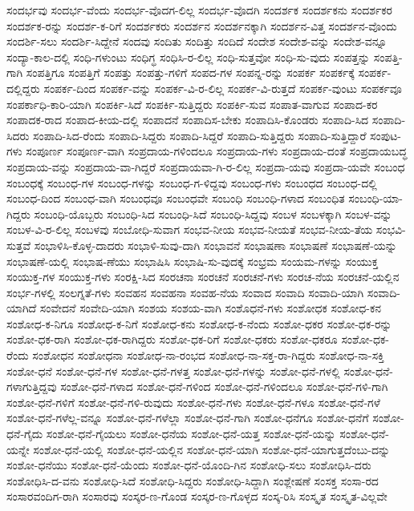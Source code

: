 {ಸಂದರ್ಭವು
ಸಂದರ್ಭ-ವೆಂದು
ಸಂದರ್ಭ-ವೊದಗ-ಲಿಲ್ಲ
ಸಂದರ್ಭ-ವೊದಗಿ
ಸಂದರ್ಶಕ
ಸಂದರ್ಶಕನು
ಸಂದರ್ಶಕರ
ಸಂದರ್ಶಕ-ರನ್ನು
ಸಂದರ್ಶ-ಕ-ರಿಗೆ
ಸಂದರ್ಶಕರು
ಸಂದರ್ಶನ
ಸಂದರ್ಶನಕ್ಕಾಗಿ
ಸಂದರ್ಶನ-ವಿತ್ತ
ಸಂದರ್ಶನ-ವೊಂದು
ಸಂದರ್ಶಿ-ಸಲು
ಸಂದರ್ಶಿ-ಸಿದ್ದೇನೆ
ಸಂದವು
ಸಂದಿತು
ಸಂದಿತ್ತು
ಸಂದಿದೆ
ಸಂದೇಶ
ಸಂದೇಶ-ವನ್ನು
ಸಂದೇಶ-ವನ್ನೂ
ಸಂದ್ಯಾ-ಕಾಲ-ದಲ್ಲಿ
ಸಂಧಿ-ಗಳುಂಟು
ಸಂಧಿಗ್ಧ
ಸಂಧಿಸಿ-ರ-ಲಿಲ್ಲ
ಸಂಧಿ-ಸುತ್ತವೋ
ಸಂಧಿ-ಸು-ವುದು
ಸಂಪತ್ತನ್ನು
ಸಂಪತ್ತಿ-ಗಾಗಿ
ಸಂಪತ್ತಿಗೂ
ಸಂಪತ್ತಿಗೆ
ಸಂಪತ್ತು
ಸಂಪತ್ತು-ಗಳಿಗೆ
ಸಂಪದ-ಗಳ
ಸಂಪನ್ನ-ರನ್ನು
ಸಂಪರ್ಕ
ಸಂಪರ್ಕಕ್ಕೆ
ಸಂಪರ್ಕ-ದಲ್ಲಿದ್ದರು
ಸಂಪರ್ಕ-ದಿಂದ
ಸಂಪರ್ಕ-ವನ್ನು
ಸಂಪರ್ಕ-ವಿ-ರ-ಲಿಲ್ಲ
ಸಂಪರ್ಕ-ವಿ-ರುತ್ತದೆ
ಸಂಪರ್ಕ-ವುಂಟು
ಸಂಪರ್ಕವೂ
ಸಂಪರ್ಕಾಧಿ-ಕಾರಿ-ಯಾಗಿ
ಸಂಪರ್ಕಿ-ಸಿದೆ
ಸಂಪರ್ಕಿ-ಸುತ್ತಿದ್ದರು
ಸಂಪರ್ಕಿ-ಸುವ
ಸಂಪಾತ-ವಾಗುವ
ಸಂಪಾದ-ಕರ
ಸಂಪಾದಕ-ರಾದ
ಸಂಪಾದ-ಕೀಯ-ದಲ್ಲಿ
ಸಂಪಾದನೆ
ಸಂಪಾದಿಸ-ಬೇಕು
ಸಂಪಾದಿಸಿ-ಕೊಂಡರು
ಸಂಪಾದಿ-ಸಿದ
ಸಂಪಾದಿ-ಸಿದರು
ಸಂಪಾದಿ-ಸಿದ-ರೆಂದು
ಸಂಪಾದಿ-ಸಿದ್ದರು
ಸಂಪಾದಿ-ಸಿದ್ದರೆ
ಸಂಪಾದಿ-ಸುತ್ತಿದ್ದರು
ಸಂಪಾದಿ-ಸುತ್ತಿದ್ದಾರೆ
ಸಂಪುಟ-ಗಳು
ಸಂಪೂರ್ಣ
ಸಂಪೂರ್ಣ-ವಾಗಿ
ಸಂಪ್ರದಾಯ-ಗಳಿಂದಲೂ
ಸಂಪ್ರದಾಯ-ಗಳು
ಸಂಪ್ರದಾಯ-ದಂತೆ
ಸಂಪ್ರದಾಯಬದ್ಧ
ಸಂಪ್ರದಾಯ-ವನ್ನು
ಸಂಪ್ರದಾಯ-ವಾ-ಗಿದ್ದರೆ
ಸಂಪ್ರದಾಯವಾ-ಗಿ-ರ-ಲಿಲ್ಲ
ಸಂಪ್ರದಾ-ಯವು
ಸಂಪ್ರದಾ-ಯವೇ
ಸಂಬಂಧ
ಸಂಬಂಧಕ್ಕೆ
ಸಂಬಂಧ-ಗಳ
ಸಂಬಂಧ-ಗಳನ್ನು
ಸಂಬಂಧ-ಗ-ಳಿದ್ದವು
ಸಂಬಂಧ-ಗಳು
ಸಂಬಂಧದ
ಸಂಬಂಧ-ದಲ್ಲಿ
ಸಂಬಂಧ-ದಿಂದ
ಸಂಬಂಧ-ವಾಗಿ
ಸಂಬಂಧವೂ
ಸಂಬಂಧವೇ
ಸಂಬಂಧಿ
ಸಂಬಂಧಿ-ಗಳಾದ
ಸಂಬಂಧಿತ
ಸಂಬಂಧಿ-ಯಾ-ಗಿದ್ದರು
ಸಂಬಂಧಿ-ಯೊಬ್ಬರು
ಸಂಬಂಧಿ-ಸಿದ
ಸಂಬಂಧಿ-ಸಿದೆ
ಸಂಬಂಧಿ-ಸಿದ್ದವು
ಸಂಬಳ
ಸಂಬಳಕ್ಕಾಗಿ
ಸಂಬಳ-ವನ್ನು
ಸಂಬಳ-ವಿ-ರ-ಲಿಲ್ಲ
ಸಂಬಳವು
ಸಂಬೋಧಿ-ಸುವಾಗ
ಸಂಭವ-ನೀಯ
ಸಂಭವ-ನೀಯತೆ
ಸಂಭವ-ನೀಯ-ತೆಯ
ಸಂಭವಿ-ಸುತ್ತವೆ
ಸಂಭಾಳಿಸಿ-ಕೊಳ್ಳ-ದಾದರು
ಸಂಭಾಳಿ-ಸುವು-ದಾಗಿ
ಸಂಭಾವನೆ
ಸಂಭಾಷಣಾ
ಸಂಭಾಷಣೆ
ಸಂಭಾಷಣೆ-ಯನ್ನು
ಸಂಭಾಷಣೆ-ಯಲ್ಲಿ
ಸಂಭಾಷ-ಣೆಯು
ಸಂಭಾಷಿಸಿ
ಸಂಭಾಷಿ-ಸು-ವುದಕ್ಕೆ
ಸಂಭ್ರಮ
ಸಂಯಮ-ಗಳನ್ನು
ಸಂಯುಕ್ತ
ಸಂಯುಕ್ತ-ಗಳ
ಸಂಯುಕ್ತ-ಗಳು
ಸಂರಕ್ಷಿ-ಸಿದ
ಸಂರಚನಾ
ಸಂರಚನೆ
ಸಂರಚನೆ-ಗಳು
ಸಂರಚ-ನೆಯ
ಸಂರಚನೆ-ಯಲ್ಲಿನ
ಸಂರ್ಭ-ಗಳಲ್ಲಿ
ಸಂಲಗ್ನತೆ-ಗಳು
ಸಂವಹನ
ಸಂವಹನಾ
ಸಂವಹ-ನೆಯ
ಸಂವಾದ
ಸಂವಾದಿ
ಸಂವಾದಿ-ಯಾಗಿ
ಸಂವಾದಿ-ಯಾಗಿದೆ
ಸಂವೇದನೆ
ಸಂವೇದಿ-ಯಾಗಿ
ಸಂಶಯ
ಸಂಶಯ-ವಾಗಿ
ಸಂಶೊಧನೆ-ಗಳು
ಸಂಶೋಧಕ
ಸಂಶೋಧ-ಕನ
ಸಂಶೋಧ-ಕ-ನಿಗೂ
ಸಂಶೋಧ-ಕ-ನಿಗೆ
ಸಂಶೋಧ-ಕನು
ಸಂಶೋಧ-ಕ-ನೆಂದು
ಸಂಶೋ-ಧಕರ
ಸಂಶೋ-ಧಕ-ರನ್ನು
ಸಂಶೋ-ಧಕ-ರಾಗಿ
ಸಂಶೋ-ಧಕ-ರಾಗಿದ್ದರು
ಸಂಶೋ-ಧಕ-ರಿಗೆ
ಸಂಶೋ-ಧಕರು
ಸಂಶೋ-ಧಕರೂ
ಸಂಶೋ-ಧಕ-ರೆಂದು
ಸಂಶೋಧನ
ಸಂಶೋಧನಾ
ಸಂಶೋಧ-ನಾ-ರಂಭದ
ಸಂಶೋಧ-ನಾ-ಸಕ್ತ-ರಾ-ಗಿದ್ದರು
ಸಂಶೋಧ-ನಾ-ಸಕ್ತಿ
ಸಂಶೋ-ಧನೆ
ಸಂಶೋ-ಧನೆ-ಗಳ
ಸಂಶೋ-ಧನೆ-ಗಳತ್ತ
ಸಂಶೋ-ಧನೆ-ಗಳನ್ನು
ಸಂಶೋ-ಧನೆ-ಗಳಲ್ಲಿ
ಸಂಶೋ-ಧನೆ-ಗಳಾಗುತ್ತಿದ್ದವು
ಸಂಶೋ-ಧನೆ-ಗಳಾದ
ಸಂಶೋ-ಧನೆ-ಗಳಿಂದ
ಸಂಶೋ-ಧನೆ-ಗಳಿಂದಲೂ
ಸಂಶೋ-ಧನೆ-ಗಳಿ-ಗಾಗಿ
ಸಂಶೋ-ಧನೆ-ಗಳಿಗೆ
ಸಂಶೋ-ಧನೆ-ಗಳಿ-ರುವುದು
ಸಂಶೋ-ಧನೆ-ಗಳು
ಸಂಶೋ-ಧನೆ-ಗಳೂ
ಸಂಶೋ-ಧನೆ-ಗಳೆ
ಸಂಶೋ-ಧನೆ-ಗಳೆಲ್ಲ-ವನ್ನೂ
ಸಂಶೋ-ಧನೆ-ಗಳೆಲ್ಲಾ
ಸಂಶೋ-ಧನೆ-ಗಾಗಿ
ಸಂಶೋ-ಧನೆಗೂ
ಸಂಶೋ-ಧನೆಗೆ
ಸಂಶೋ-ಧನೆ-ಗೈದು
ಸಂಶೋ-ಧನೆ-ಗೈಯಲು
ಸಂಶೋ-ಧನೆಯ
ಸಂಶೋ-ಧನೆ-ಯತ್ತ
ಸಂಶೋ-ಧನೆ-ಯನ್ನು
ಸಂಶೋ-ಧನೆ-ಯನ್ನೇ
ಸಂಶೋ-ಧನೆ-ಯಲ್ಲಿ
ಸಂಶೋ-ಧನೆ-ಯಲ್ಲಿನ
ಸಂಶೋ-ಧನೆ-ಯಾಗಿ
ಸಂಶೋ-ಧನೆ-ಯಾಗುತ್ತದೆಂಬು-ದನ್ನು
ಸಂಶೋ-ಧನೆಯು
ಸಂಶೋ-ಧನೆ-ಯೆಂದು
ಸಂಶೋ-ಧನೆ-ಯೊಂದಿ-ಗಿನ
ಸಂಶೋಧಿ-ಸಲು
ಸಂಶೋಧಿಸಿ-ದರು
ಸಂಶೋಧಿಸಿ-ದ-ವನು
ಸಂಶೋಧಿ-ಸಿದೆ
ಸಂಶೋಧಿ-ಸಿದ್ದರು
ಸಂಶೋಧಿ-ಸಿದ್ದಾಗಿ
ಸಂಶ್ಲೇಷಣೆ
ಸಂಸಕ್ತ
ಸಂಸಾ-ರದ
ಸಂಸಾರವಂದಿಗ-ರಾಗಿ
ಸಂಸಾರವು
ಸಂಸ್ಕರ-ಣ-ಗೊಂಡ
ಸಂಸ್ಕರ-ಣ-ಗೊಳ್ಳದ
ಸಂಸ್ಕ-ರಿಸಿ
ಸಂಸ್ಕೃತ
ಸಂಸ್ಕೃತ-ವಿಲ್ಲವೇ
}
